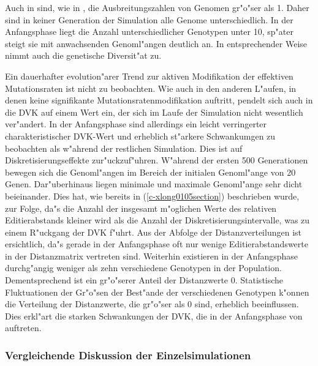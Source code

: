 Auch in  sind, wie in , die Ausbreitungszahlen von Genomen gr"o"ser als 1.
Daher sind in keiner Generation der Simulation alle Genome unterschiedlich. In der Anfangsphase liegt die Anzahl
unterschiedlicher Genotypen unter 10, sp"ater steigt sie mit anwachsenden Genoml"angen deutlich an. In entsprechender
Weise nimmt auch die genetische Diversit"at zu.

Ein dauerhafter evolution"arer Trend zur aktiven Modifikation der effektiven Mutationsraten ist nicht zu beobachten.
Wie auch in den anderen L"aufen, in denen keine signifikante Mutationsratenmodifikation auftritt, pendelt sich auch
in  die DVK auf einem Wert ein, der sich im Laufe der Simulation nicht wesentlich ver"andert.
In der Anfangsphase sind allerdings ein leicht verringerter charakteristischer DVK-Wert und erheblich st"arkere
Schwankumgen zu beobachten als w"ahrend der restlichen Simulation. Dies ist auf Diskretisierungseffekte zur"uckzuf"uhren.
W"ahrend der ersten 500 Generationen bewegen sich die Genoml"angen im Bereich der initialen Genoml"ange von 20 Genen.
Dar"uberhinaus liegen minimale und maximale Genoml"ange sehr dicht beieinander. Dies hat, wie bereits in
(\ref{c-xlong0105section}) beschrieben wurde, zur Folge, da"s die Anzahl der insgesamt m"oglichen Werte des
relativen Editierabstands kleiner wird als die Anzahl der Diskretisierungsintervalle, was zu einem R"uckgang
der DVK f"uhrt. Aus der Abfolge der Distanzverteilungen ist ersichtlich, da"s gerade in der Anfangsphase oft nur
wenige Editierabstandswerte in der Distanzmatrix vertreten sind. Weiterhin existieren in der Anfangsphase durchg"angig weniger als
zehn verschiedene Genotypen in der Population. Dementsprechend ist ein gr"o"serer Anteil der Distanzwerte 0. Statistische
Fluktuationen der Gr"o"sen der Best"ande der verschiedenen Genotypen k"onnen die Verteilung der Distanzwerte,
die gr"o"ser als 0 sind, erheblich beeinflussen. Dies erkl"art die starken Schwankungen der DVK, die in der
Anfangsphase von  auftreten.


\subsubsection{Vergleichende Diskussion der Einzelsimulationen}
\label{lndga-comparesingle}

